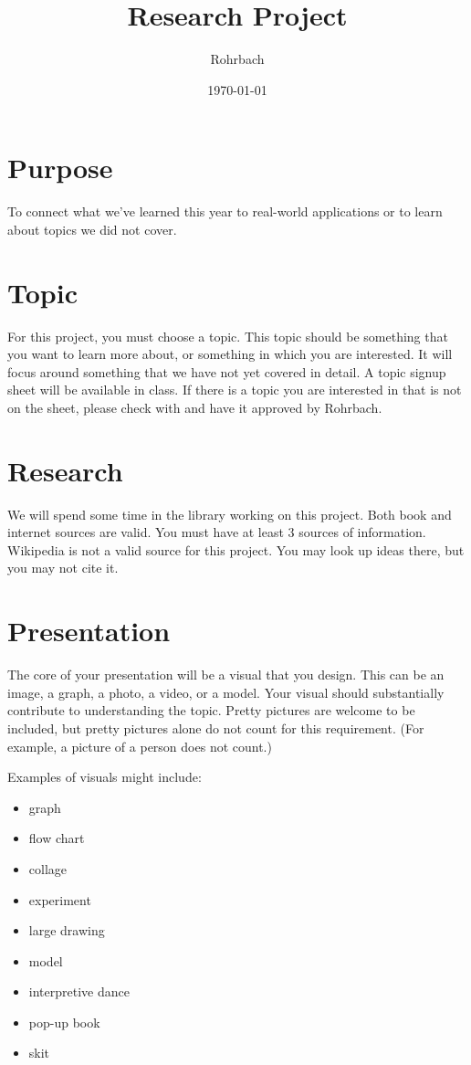 \documentclass[11pt]{exam}
\title{Research Project}
\author{Rohrbach}
\date{\today}
\begin{document}
\maketitle

\section*{Purpose}
To connect what we've learned this year to real-world applications or to learn about topics we did not cover.

\section*{Topic}
For this project, you must choose a topic.  This topic should be something that you want to learn more about, or something in which you are interested.  It will focus around something that we have not yet covered in detail.  A topic signup sheet will be available in class.  If there is a topic you are interested in that is not on the sheet, please check with and have it approved by Rohrbach.

\section*{Research}
We will spend some time in the library working on this project.  Both book and internet sources are valid.  You must have at least 3 sources of information.  {\sc Wikipedia is not a valid source for this project.}  You may look up ideas there, but you may not cite it.

\section*{Presentation}
The core of your presentation will be a visual that you design.  This can be an image, a graph, a photo, a video, or a model.  Your visual should substantially contribute to understanding the topic.  Pretty pictures are welcome to be included, but pretty pictures alone do not count for this requirement. (For example, a picture of a person does not count.) 

Examples of visuals might include: 

\begin{multicols}{3}
  \begin{itemize}
    \item	graph
    \item	flow chart
    \item	collage
    \item	experiment
    \item	large drawing
    \item	model
    \item	interpretive dance
    \item	pop-up book
    \item	skit
  \end{itemize}
\end{multicols}
 
\end{document}
